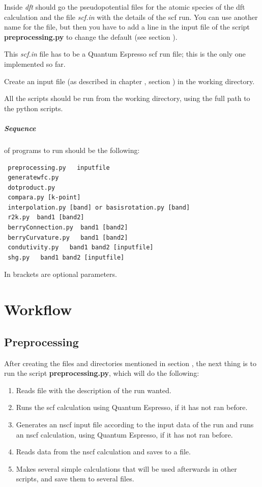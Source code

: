 \documentclass[a4paper,12pt]{report}
\begin{document}
 Inside \emph{dft} should go the pseudopotential files for the atomic species of the dft calculation
and the file \emph{scf.in} with the details of the scf run.
You can use another name for the file, but then you have to add a line in the input file of
the script \textbf{preprocessing.py} to change the default (see section ).

 This \emph{scf.in} file has to be a {\sc Quantum Espresso} scf run file;
 this is the only one implemented so far.

 Create an input file (as described in chapter , section )
 in the working directory.

 All the scripts should be run from the working directory, using the full path to the python scripts.

\paragraph{Sequence} of programs to run should be the following:
\begin{verbatim}
 preprocessing.py   inputfile
 generatewfc.py
 dotproduct.py
 compara.py [k-point]
 interpolation.py [band] or basisrotation.py [band]
 r2k.py  band1 [band2]
 berryConnection.py  band1 [band2]
 berryCurvature.py   band1 [band2]
 condutivity.py   band1 band2 [inputfile]
 shg.py   band1 band2 [inputfile]
\end{verbatim}
In brackets are optional parameters.




\chapter{Workflow}\label{ch:workflow}

\section{Preprocessing}\label{sec:preprocessing}
 After creating the files and directories mentioned in section , the next thing is
 to run the script \textbf{preprocessing.py}, which will do the following:
 \begin{enumerate}
  \item Reads file with the description of the run wanted.
  \item Runs the scf calculation using {\sc Quantum Espresso}, if it has not ran before.
  \item Generates an nscf input file according to the input data of the run and runs an nscf calculation,
  using {\sc Quantum Espresso}, if it has not ran before.
  \item Reads data from the nscf calculation and saves to a file.
  \item Makes several simple calculations that will be used afterwards in other scripts, and save them to several files.
 \end{enumerate}
\end{document}

